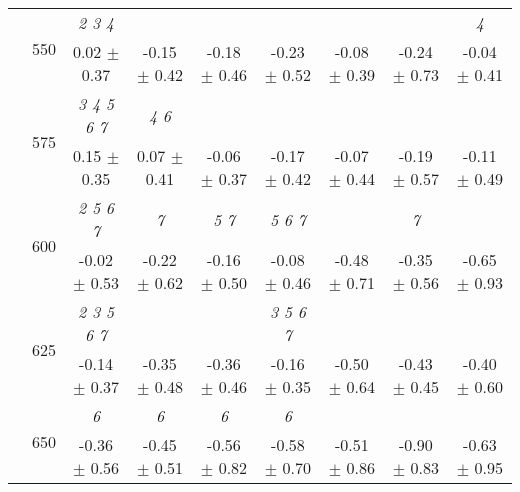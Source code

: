\begin{table}[h]
{\begin{tabular}{
        ccccccccc}
 & \multirow{2}{*}{550}& \textit{ 2 3 4 }& & & & & & \textit{ 4 } \\ 
 & & 0.02 $\pm$ 0.37& -0.15 $\pm$ 0.42& -0.18 $\pm$ 0.46& -0.23 $\pm$ 0.52& -0.08 $\pm$ 0.39& -0.24 $\pm$ 0.73& -0.04 $\pm$ 0.41 \\ 
 & \multirow{2}{*}{575}& \cellcolor[HTML]{EFEFEF} \textit{ 3 4 5 6 7 }& \cellcolor[HTML]{EFEFEF} \textit{ 4 6 }& \cellcolor[HTML]{EFEFEF} & \cellcolor[HTML]{EFEFEF} & \cellcolor[HTML]{EFEFEF} & \cellcolor[HTML]{EFEFEF} & \cellcolor[HTML]{EFEFEF}  \\ 
 & & \cellcolor[HTML]{EFEFEF} 0.15 $\pm$ 0.35& \cellcolor[HTML]{EFEFEF} 0.07 $\pm$ 0.41& \cellcolor[HTML]{EFEFEF} -0.06 $\pm$ 0.37& \cellcolor[HTML]{EFEFEF} -0.17 $\pm$ 0.42& \cellcolor[HTML]{EFEFEF} -0.07 $\pm$ 0.44& \cellcolor[HTML]{EFEFEF} -0.19 $\pm$ 0.57& \cellcolor[HTML]{EFEFEF} -0.11 $\pm$ 0.49 \\ 
 & \multirow{2}{*}{600}& \textit{ 2 5 6 7 }& \textit{ 7 }& \textit{ 5 7 }& \textit{ 5 6 7 }& & \textit{ 7 }&  \\ 
 & & -0.02 $\pm$ 0.53& -0.22 $\pm$ 0.62& -0.16 $\pm$ 0.50& -0.08 $\pm$ 0.46& -0.48 $\pm$ 0.71& -0.35 $\pm$ 0.56& -0.65 $\pm$ 0.93 \\ 
 & \multirow{2}{*}{625}& \cellcolor[HTML]{EFEFEF} \textit{ 2 3 5 6 7 }& \cellcolor[HTML]{EFEFEF} & \cellcolor[HTML]{EFEFEF} & \cellcolor[HTML]{EFEFEF} \textit{ 3 5 6 7 }& \cellcolor[HTML]{EFEFEF} & \cellcolor[HTML]{EFEFEF} & \cellcolor[HTML]{EFEFEF}  \\ 
 & & \cellcolor[HTML]{EFEFEF} -0.14 $\pm$ 0.37& \cellcolor[HTML]{EFEFEF} -0.35 $\pm$ 0.48& \cellcolor[HTML]{EFEFEF} -0.36 $\pm$ 0.46& \cellcolor[HTML]{EFEFEF} -0.16 $\pm$ 0.35& \cellcolor[HTML]{EFEFEF} -0.50 $\pm$ 0.64& \cellcolor[HTML]{EFEFEF} -0.43 $\pm$ 0.45& \cellcolor[HTML]{EFEFEF} -0.40 $\pm$ 0.60 \\ 
 & \multirow{2}{*}{650}& \textit{ 6 }& \textit{ 6 }& \textit{ 6 }& \textit{ 6 }& & &  \\ 
 & & -0.36 $\pm$ 0.56& -0.45 $\pm$ 0.51& -0.56 $\pm$ 0.82& -0.58 $\pm$ 0.70& -0.51 $\pm$ 0.86& -0.90 $\pm$ 0.83& -0.63 $\pm$ 0.95 \\ \midrule 

        \bottomrule
        \end{tabular}%
        }

        \end{table}
        
